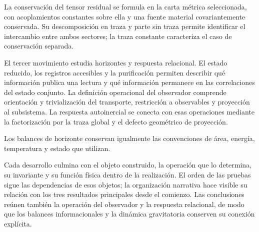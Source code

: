 La conservación del tensor residual se formula en la carta métrica
seleccionada, con acoplamientos constantes sobre ella y una fuente
material covariantemente conservada. Su descomposición en traza y parte
sin traza permite identificar el intercambio entre ambos sectores;
la traza constante caracteriza el caso de conservación separada.

El tercer movimiento estudia horizontes y respuesta relacional. El estado
reducido, los registros accesibles y la purificación permiten describir
qué información publica una lectura y qué información permanece en las
correlaciones del estado conjunto. La definición operacional del
observador comprende orientación y trivialización del transporte,
restricción a observables y proyección al subsistema. La respuesta
autoinercial se conecta con esas operaciones mediante la factorización
por la traza global y el defecto geométrico de proyección.

Los balances de horizonte conservan igualmente las convenciones de
área, energía, temperatura y estado que utilizan.

Cada desarrollo culmina con el objeto construido, la operación que lo
determina, su invariante y su función física dentro de la realización.
El orden de las pruebas sigue las dependencias de esos objetos; la
organización narrativa hace visible su relación con los tres resultados
principales desde el comienzo. Las conclusiones reúnen también la
operación del observador y la respuesta relacional, de modo que los
balances informacionales y la dinámica gravitatoria conserven su
conexión explícita.

